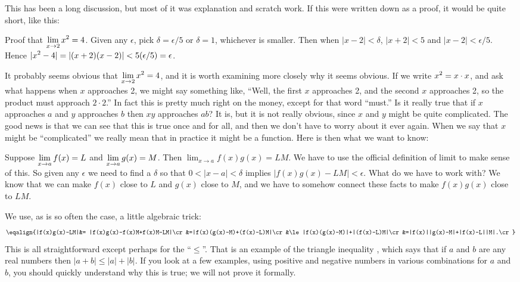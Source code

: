 This has been a long discussion, but most of it was explanation and
scratch work. If this were written down as a proof, it would be quite
short, like this:

Proof that $\displaystyle \lim_{x\to 2}x^2=4$. Given any $\epsilon$, pick
$\delta=\epsilon/5$ or $\delta=1$, whichever is smaller. Then when
$|x-2|<\delta$, $|x+2|<5$ and
$|x-2|<\epsilon/5$. Hence $\displaystyle |x^2-4|=|(x+2)(x-2)|<5(\epsilon/5) =
\epsilon$. 
\endexample

It probably seems obvious that $\displaystyle \lim_{x\to2}x^2=4$, and it is worth
examining more closely why it seems obvious. If we write $\displaystyle x^2=x\cdot
x$, and ask what happens when $x$ approaches 2, we might say something
like, ``Well, the first $x$ approaches 2, and the second $x$
approaches 2, so the product must approach $2\cdot2$.'' In fact this is
pretty much right on the money, except for that word ``must.'' Is it
really true that if $x$ approaches $a$ and $y$ approaches $b$ then
$xy$ approaches $ab$? It is, but it is not really obvious, since $x$
and $y$ might be quite complicated. The good news is that we can see
that this is true once and for all, and then we don't have to worry
about it ever again. When we say that $x$ might be ``complicated'' we
really mean that in practice it might be a function. Here is then what
we want to know:

\thm Suppose $\displaystyle \lim_{x\to a} f(x)=L$ and $\displaystyle \lim_{x\to a}g(x)=M$. Then
\hfill\break
$\lim_{x\to a} f(x)g(x) = LM$.
\endthm
\proof We have to use the official definition of limit to make sense
of this. So given any $\epsilon$ we need to find a $\delta$ so that
$0<|x-a|<\delta$ implies $|f(x)g(x)-LM|<\epsilon$. What do we have to
work with? We know that we can make $f(x)$ close to $L$ and $g(x)$
close to $M$, and we have to somehow connect these facts to make
$f(x)g(x)$ close to $LM$.

We use, as is so often the case, a little algebraic
trick: 
$$\eqalign{|f(x)g(x)-LM|&= |f(x)g(x)-f(x)M+f(x)M-LM|\cr
&=|f(x)(g(x)-M)+(f(x)-L)M|\cr
&\le |f(x)(g(x)-M)|+|(f(x)-L)M|\cr
&=|f(x)||g(x)-M|+|f(x)-L||M|.\cr}
$$ 
This is all straightforward except perhaps for the ``$\le$''. That is
an example of the {\dfont triangle inequality%
}, 
which says that if $a$ and $b$ are any real
numbers then $|a+b|\le |a|+|b|$. If you look at a few examples, using
positive and negative numbers in various combinations for $a$ and $b$,
you should quickly understand why this is true; we will not prove it
formally. 

